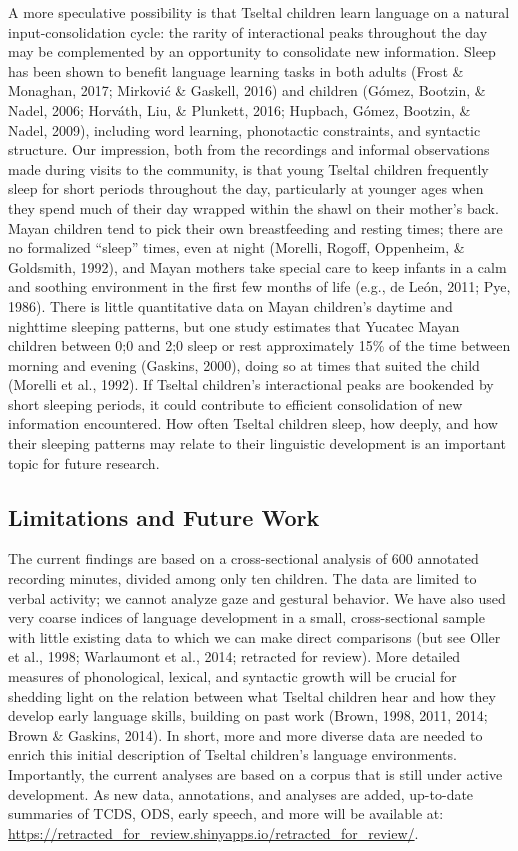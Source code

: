 \documentclass[floatsintext,man]{apa6}
\theoremstyle{definition}
\theoremstyle{definition}
\theoremstyle{definition}
\theoremstyle{remark}
\begin{document}
A more speculative possibility is that Tseltal children learn language
on a natural input-consolidation cycle: the rarity of interactional
peaks throughout the day may be complemented by an opportunity to
consolidate new information. Sleep has been shown to benefit language
learning tasks in both adults (Frost \& Monaghan, 2017; Mirković \&
Gaskell, 2016) and children (Gómez, Bootzin, \& Nadel, 2006; Horváth,
Liu, \& Plunkett, 2016; Hupbach, Gómez, Bootzin, \& Nadel, 2009),
including word learning, phonotactic constraints, and syntactic
structure. Our impression, both from the recordings and informal
observations made during visits to the community, is that young Tseltal
children frequently sleep for short periods throughout the day,
particularly at younger ages when they spend much of their day wrapped
within the shawl on their mother's back. Mayan children tend to pick
their own breastfeeding and resting times; there are no formalized
\enquote{sleep} times, even at night (Morelli, Rogoff, Oppenheim, \&
Goldsmith, 1992), and Mayan mothers take special care to keep infants in
a calm and soothing environment in the first few months of life (e.g.,
de León, 2011; Pye, 1986). There is little quantitative data on Mayan
children's daytime and nighttime sleeping patterns, but one study
estimates that Yucatec Mayan children between 0;0 and 2;0 sleep or rest
approximately 15\% of the time between morning and evening (Gaskins,
2000), doing so at times that suited the child (Morelli et al., 1992).
If Tseltal children's interactional peaks are bookended by short
sleeping periods, it could contribute to efficient consolidation of new
information encountered. How often Tseltal children sleep, how deeply,
and how their sleeping patterns may relate to their linguistic
development is an important topic for future research.

\subsection{Limitations and Future Work}\label{disc-limfut}

The current findings are based on a cross-sectional analysis of 600
annotated recording minutes, divided among only ten children. The data
are limited to verbal activity; we cannot analyze gaze and gestural
behavior. We have also used very coarse indices of language development
in a small, cross-sectional sample with little existing data to which we
can make direct comparisons (but see Oller et al., 1998; Warlaumont et
al., 2014; retracted for review). More detailed measures of
phonological, lexical, and syntactic growth will be crucial for shedding
light on the relation between what Tseltal children hear and how they
develop early language skills, building on past work (Brown, 1998, 2011,
2014; Brown \& Gaskins, 2014). In short, more and more diverse data are
needed to enrich this initial description of Tseltal children's language
environments. Importantly, the current analyses are based on a corpus
that is still under active development. As new data, annotations, and
analyses are added, up-to-date summaries of TCDS, ODS, early speech, and
more will be available at:
\url{https://retracted_for_review.shinyapps.io/retracted_for_review/}.
\end{document}
